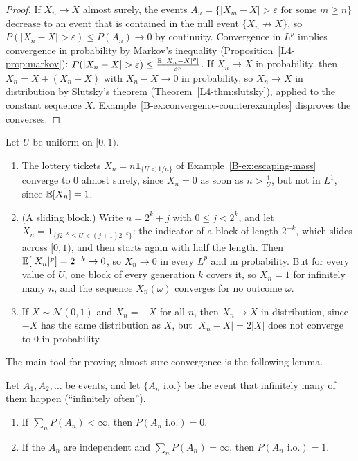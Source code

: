\begin{proof}
    If $X_n \to X$ almost surely, the events $A_n = \{|X_m - X| > \varepsilon \text{ for some } m \geq n\}$ decrease to an event that is contained in the null event $\{X_n \not\to X\}$, so $P(|X_n - X| > \varepsilon) \leq P(A_n) \to 0$ by continuity. Convergence in $L^p$ implies convergence in probability by Markov's inequality (Proposition~\ref{L4-prop:markov}): $P(|X_n - X| > \varepsilon) \leq \frac{\mathbb{E}[|X_n - X|^p]}{\varepsilon^p}$. If $X_n \to X$ in probability, then $X_n = X + (X_n - X)$ with $X_n - X \to 0$ in probability, so $X_n \to X$ in distribution by Slutsky's theorem (Theorem~\ref{L4-thm:slutsky}), applied to the constant sequence $X$. Example~\ref{B-ex:convergence-counterexamples} disproves the converses.
\end{proof}

\begin{example}\label{B-ex:convergence-counterexamples}
    Let $U$ be uniform on $[0, 1)$.
    \begin{enumerate}
        \item The lottery tickets $X_n = n\mathbf{1}_{\{U < 1/n\}}$ of Example~\ref{B-ex:escaping-mass} converge to $0$ almost surely, since $X_n = 0$ as soon as $n > \frac{1}{U}$, but not in $L^1$, since $\mathbb{E}[X_n] = 1$.
        \item (A sliding block.) Write $n = 2^k + j$ with $0 \leq j < 2^k$, and let $X_n = \mathbf{1}_{\{j2^{-k} \leq U < (j + 1)2^{-k}\}}$: the indicator of a block of length $2^{-k}$, which slides across $[0, 1)$, and then starts again with half the length. Then $\mathbb{E}[|X_n|^p] = 2^{-k} \to 0$, so $X_n \to 0$ in every $L^p$ and in probability. But for every value of $U$, one block of every generation $k$ covers it, so $X_n = 1$ for infinitely many $n$, and the sequence $X_n(\omega)$ converges for no outcome $\omega$.
        \item If $X \sim \mathcal{N}(0, 1)$ and $X_n = -X$ for all $n$, then $X_n \to X$ in distribution, since $-X$ has the same distribution as $X$, but $|X_n - X| = 2|X|$ does not converge to $0$ in probability.
    \end{enumerate}
\end{example}

The main tool for proving almost sure convergence is the following lemma.

\begin{lemma}\label{B-lem:borel-cantelli}
    Let $A_1, A_2, \ldots$ be events, and let $\{A_n \text{ i.o.}\}$ be the event that infinitely many of them happen (``infinitely often'').
    \begin{enumerate}
        \item If $\sum_n P(A_n) < \infty$, then $P(A_n \text{ i.o.}) = 0$.
        \item If the $A_n$ are independent and $\sum_n P(A_n) = \infty$, then $P(A_n \text{ i.o.}) = 1$.
    \end{enumerate}
\end{lemma}

